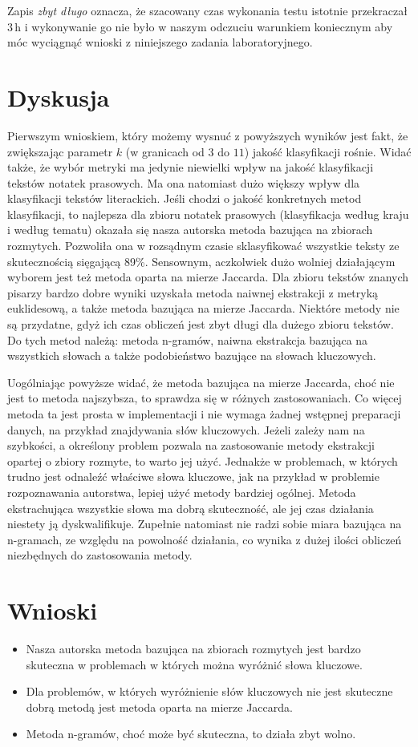 \documentclass[a4paper]{classrep}
\begin{document}
Zapis \emph{zbyt długo} oznacza, że szacowany czas wykonania testu istotnie przekraczał $3\,\mbox{h}$ i wykonywanie
go nie było w naszym odczuciu warunkiem koniecznym aby móc wyciągnąć wnioski z niniejszego zadania laboratoryjnego.

\section{Dyskusja}
Pierwszym wnioskiem, który możemy wysnuć z powyższych wyników jest fakt, że zwiększając parametr \(k\) (w granicach od \(3\) do \(11\)) jakość klasyfikacji rośnie. Widać także,
że wybór metryki ma jedynie niewielki wpływ na jakość klasyfikacji tekstów notatek prasowych. Ma ona natomiast dużo większy wpływ dla klasyfikacji tekstów literackich.
Jeśli chodzi o jakość konkretnych metod klasyfikacji, to najlepsza dla zbioru notatek prasowych (klasyfikacja według kraju i według tematu)
okazała się nasza autorska metoda bazująca na zbiorach rozmytych. Pozwoliła ona w rozsądnym czasie sklasyfikować wszystkie teksty ze skutecznością sięgającą 89\%. Sensownym, aczkolwiek
dużo wolniej działającym wyborem jest też metoda oparta na mierze Jaccarda.
Dla zbioru tekstów znanych pisarzy bardzo dobre wyniki uzyskała metoda naiwnej ekstrakcji z metryką euklidesową,
a także metoda bazująca na mierze Jaccarda. Niektóre metody nie są przydatne, gdyż ich czas obliczeń jest zbyt długi dla dużego zbioru tekstów. Do tych metod należą:
metoda n-gramów, naiwna ekstrakcja bazująca na wszystkich słowach a także podobieństwo bazujące na słowach kluczowych.

Uogólniając powyższe widać, że metoda bazująca na mierze Jaccarda, choć nie jest to metoda najszybsza, to sprawdza się w różnych zastosowaniach. Co więcej metoda ta jest
prosta w implementacji i nie wymaga żadnej wstępnej preparacji danych, na przykład znajdywania słów kluczowych. Jeżeli zależy nam na szybkości, a określony problem pozwala
na zastosowanie metody ekstrakcji opartej o zbiory rozmyte, to warto jej użyć. Jednakże w problemach, w których trudno jest odnaleźć właściwe słowa kluczowe, jak na przykład
w problemie rozpoznawania autorstwa, lepiej użyć metody bardziej ogólnej. Metoda ekstrachująca wszystkie słowa ma dobrą skuteczność, ale jej czas działania  niestety ją dyskwalifikuje.
Zupełnie natomiast nie radzi sobie miara bazująca na n-gramach, ze względu na powolność działania, co wynika z dużej ilości obliczeń niezbędnych do zastosowania metody. 
\section{Wnioski}
\begin{itemize}
\item Nasza autorska metoda bazująca na zbiorach rozmytych jest bardzo skuteczna w problemach w których można wyróżnić słowa kluczowe.
\item Dla problemów, w których wyróżnienie słów kluczowych nie jest skuteczne dobrą metodą jest metoda oparta na mierze Jaccarda.
\item Metoda n-gramów, choć może być skuteczna, to działa zbyt wolno.
\end{itemize}
\end{document}
